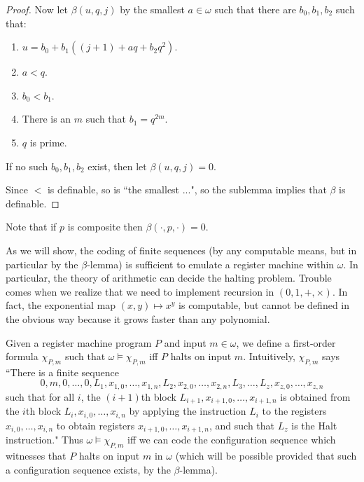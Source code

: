 \documentclass[12pt]{report}
\theoremstyle{definition}
\begin{document}
\begin{proof}
Now let $\beta(u, q, j)$ by the smallest $a \in \omega$ such that there are $b_0, b_1, b_2$ such that:
\begin{enumerate}
\item $u = b_0 + b_1((j+1) + aq + b_2q^2)$.
\item $a < q$.
\item $b_0 < b_1$.
\item There is an $m$ such that $b_1 = q^{2m}$.
\item $q$ is prime.
\end{enumerate}
If no such $b_0, b_1, b_2$ exist, then let $\beta(u, q, j) = 0$.

Since $<$ is definable, so is ``the smallest ...", so the sublemma implies that $\beta$ is definable.
\end{proof}
Note that if $p$ is composite then $\beta(\cdot, p, \cdot) = 0$.

As we will show, the coding of finite sequences (by any computable means, but in particular by the $\beta$-lemma) is sufficient to emulate a register machine within $\omega$. In particular, the theory of arithmetic can decide the halting problem. Trouble comes when we realize that we need to implement recursion in $(0, 1, +, \times)$. In fact, the exponential map $(x, y) \mapsto x^y$ is computable, but cannot be defined in the obvious way because it grows faster than any polynomial.

Given a register machine program $P$ and input $m \in \omega$, we define a first-order formula $\chi_{P,m}$ such that $\omega \models \chi_{P,m}$ iff $P$ halts on input $m$. Intuitively, $\chi_{P,m}$ says ``There is a finite sequence
$$0, m, 0, \dots, 0, L_1, x_{1,0}, \dots, x_{1,n}, L_2, x_{2,0}, \dots, x_{2,n}, L_3, \dots, L_z, x_{z,0}, \dots, x_{z,n}$$
such that for all $i$, the $(i+1)$th block $L_{i+1}, x_{i+1,0}, \dots, x_{i+1,n}$ is obtained from the $i$th block $L_i, x_{i,0}, \dots, x_{i,n}$ by applying the instruction $L_i$ to the registers $x_{i,0}, \dots, x_{i,n}$ to obtain registers $x_{i+1,0}, \dots, x_{i+1,n}$, and such that $L_z$ is the Halt instruction."
Thus $\omega \models \chi_{P,m}$ iff we can code the configuration sequence which witnesses that $P$ halts on input $m$ in $\omega$ (which will be possible provided that such a configuration sequence exists, by the $\beta$-lemma).
\end{document}
